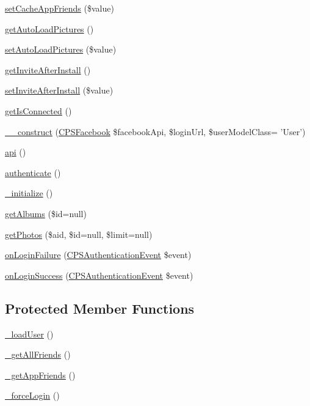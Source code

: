\begin{DoxyCompactItemize}
\hyperlink{classCPSFacebookUserIdentity_a3f665b8d4df7bb1952cb8fc3f5b75561}{setCacheAppFriends} (\$value)
\item 
\hyperlink{classCPSFacebookUserIdentity_a74a2e7cb200195c32d0b9552a331445a}{getAutoLoadPictures} ()
\item 
\hyperlink{classCPSFacebookUserIdentity_af4ec9526210829eed07fbf8bcd74f784}{setAutoLoadPictures} (\$value)
\item 
\hyperlink{classCPSFacebookUserIdentity_aed530f3943074ab9826563b51db5420a}{getInviteAfterInstall} ()
\item 
\hyperlink{classCPSFacebookUserIdentity_acb332c6546b31eabe02618a7ccc2732c}{setInviteAfterInstall} (\$value)
\item 
\hyperlink{classCPSFacebookUserIdentity_a966f0f14413b21e8d4e8cf5180cdf627}{getIsConnected} ()
\item 
\hyperlink{classCPSFacebookUserIdentity_a7bfb59fe7d249a66abbd2c1ea8b9b8ec}{\_\-\_\-construct} (\hyperlink{classCPSFacebook}{CPSFacebook} \$facebookApi, \$loginUrl, \$userModelClass= 'User')
\item 
\hyperlink{classCPSFacebookUserIdentity_aa238fcc5cb30759876aa89cd2e0711c1}{api} ()
\item 
\hyperlink{classCPSFacebookUserIdentity_a750c93a7dfab5314f2bf662a407bc5a6}{authenticate} ()
\item 
\hyperlink{classCPSFacebookUserIdentity_aa4239198c895a9c8c1ea86753ed49095}{\_\-initialize} ()
\item 
\hyperlink{classCPSFacebookUserIdentity_a21df9dbf22cd606881c65d284208c90c}{getAlbums} (\$id=null)
\item 
\hyperlink{classCPSFacebookUserIdentity_a11900d7eee85bed9fda1a24827c1c5bf}{getPhotos} (\$aid, \$id=null, \$limit=null)
\item 
\hyperlink{classCPSFacebookUserIdentity_a0e6ee11d30fc9d158e8464759e64c1f8}{onLoginFailure} (\hyperlink{classCPSAuthenticationEvent}{CPSAuthenticationEvent} \$event)
\item 
\hyperlink{classCPSFacebookUserIdentity_acad8b3c7359a6bd26c2399d8d5819b2b}{onLoginSuccess} (\hyperlink{classCPSAuthenticationEvent}{CPSAuthenticationEvent} \$event)
\end{DoxyCompactItemize}
\subsection*{Protected Member Functions}
\begin{DoxyCompactItemize}
\item 
\hyperlink{classCPSFacebookUserIdentity_a617a5b82b3ed6584e34461d71febb2cf}{\_\-loadUser} ()
\item 
\hyperlink{classCPSFacebookUserIdentity_a5a06de218ff8a267b61639c319862fa8}{\_\-getAllFriends} ()
\item 
\hyperlink{classCPSFacebookUserIdentity_ad0e0d1a30e4654cb79ddcd1b759f956b}{\_\-getAppFriends} ()
\item 
\hyperlink{classCPSFacebookUserIdentity_a8db1c87ff7cf16af4110476a303ca342}{\_\-forceLogin} ()
\end{DoxyCompactItemize}
